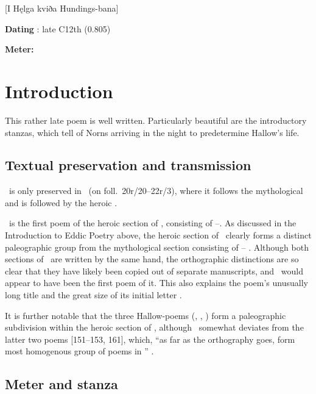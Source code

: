 [I Hęlga kviða Hundings-bana]

\begin{flushright}%
\textbf{Dating} \parencite{Sapp2022}: late C12th (0.805)

\textbf{Meter:} \Fornyrdislag%
\end{flushright}%

\section{Introduction}

This rather late poem is well written.  Particularly beautiful are the introductory stanzas, which tell of Norns arriving in the night to predetermine Hallow’s life.

\subsection{Textual preservation and transmission}

\HelgakvidaOne\ is only preserved in \Regius\ (on foll.~20r/20--22r/3), where it follows the mythological  and is followed by the heroic .

\HelgakvidaOne\ is the first poem of the heroic section of \Regius, consisting of \HelgakvidaOne--\Hamdismal.  As discussed in the Introduction to Eddic Poetry above, the heroic section of \Regius\ clearly forms a distinct paleographic group from the mythological section consisting of -- \parencite[esp.~pp.~160--163]{Lindblad1980}.  Although both sections of \Regius\ are written by the same hand, the orthographic distinctions are so clear that they have likely been copied out of separate manuscripts, and \HelgakvidaOne\ would appear to have been the first poem of it.  This also explains the poem’s unusually long title and the great size of its initial letter \parencite[166]{Lindblad1980}.

It is further notable that the three Hallow-poems (\HelgakvidaOne, , ) form a paleographic subdivision within the heroic section of \Regius, although \HelgakvidaOne\ somewhat deviates from the latter two poems \parencite{Lindblad1980}[151--153, 161], which, “as far as the orthography goes, form most homogenous group of poems in \Regius” \parencite[153]{Lindblad1980}.

\subsection{Meter and stanza}

